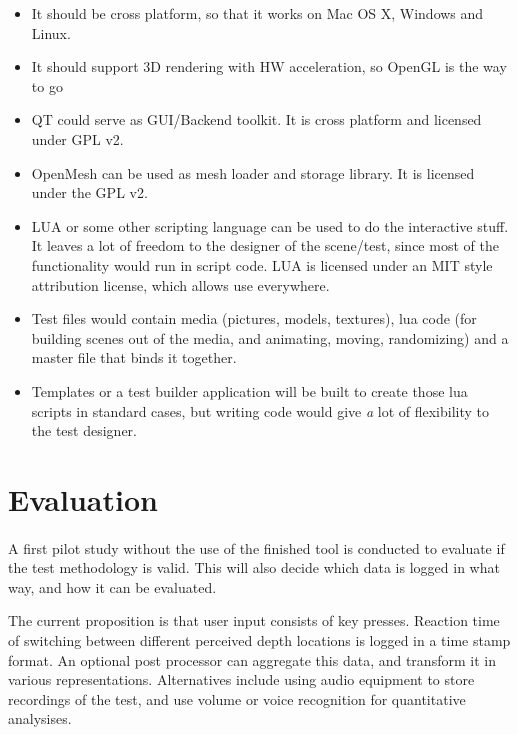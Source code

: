 \documentclass[11pt]{scrartcl}
\begin{document}
\begin{multicols}{2}
\begin{itemize}
\item It should be cross platform, so that it works on Mac OS X, Windows and Linux.
\item It should support 3D rendering with HW acceleration, so OpenGL is the way to go
\item QT could serve as GUI/Backend toolkit. It is cross platform and licensed under GPL v2.
\item OpenMesh can be used as mesh loader and storage library. It is licensed under the GPL v2.
\item LUA or some other scripting language can be used to do the interactive stuff. It leaves a lot of freedom to the designer of the scene/test, since most of the functionality would run in script code. LUA is licensed under an MIT style attribution license, which allows use everywhere.
\item Test files would contain media (pictures, models, textures), lua code (for building scenes out of the media, and animating, moving, randomizing) and a master file that binds it together.
\item Templates or a test builder application will be built to create those lua scripts in standard cases, but writing code would give {\textit a lot} of flexibility to the test designer.
\end{itemize}

\section{Evaluation}
\paragraph{}
A first pilot study without the use of the finished tool is conducted to evaluate if the test methodology is valid. This will also decide which data is logged in what way, and how it can be evaluated.

The current proposition is that user input consists of key presses. Reaction time of switching between different perceived depth locations is logged in a time stamp format. An optional post processor can aggregate this data, and transform it in various representations. Alternatives include using audio equipment to store recordings of the test, and use volume or voice recognition for quantitative analysises. 


\end{multicols}
\end{document}

